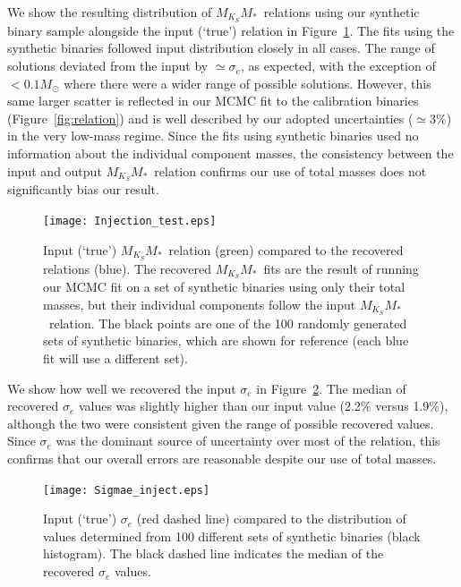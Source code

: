 \documentclass[twocolumn]{aastex62}
\newcommand{\mmk}{$M_{K_S}$\textendash$M_*$}
\begin{document}
We show the resulting distribution of \mmk\ relations using our synthetic binary sample alongside the input (`true') relation in Figure~\ref{fig:inject}. The fits using the synthetic binaries followed input distribution closely in all cases. The range of solutions deviated from the input by $\simeq\sigma_e$, as expected, with the exception of $<0.1M_\odot$ where there were a wider range of possible solutions. However, this same larger scatter is reflected in our MCMC fit to the calibration binaries (Figure~\ref{fig:relation}) and is well described by our adopted uncertainties ($\simeq3\%$) in the very low-mass regime. Since the fits using synthetic binaries used no information about the individual component masses, the consistency between the input and output \mmk\ relation confirms our use of total masses does not significantly bias our result.

\begin{figure}[h]
\begin{center}
\texttt{[image: Injection\_test.eps]}
\caption{Input (`true') \mmk\ relation (green) compared to the recovered relations (blue). The recovered \mmk\ fits are the result of running our MCMC fit on a set of synthetic binaries using only their total masses, but their individual components follow the input \mmk\ relation. The black points are one of the 100 randomly generated sets of synthetic binaries, which are shown for reference (each blue fit will use a different set). }
\label{fig:inject}
\end{center}
\end{figure}

We show how well we recovered the input $\sigma_e$ in Figure~\ref{fig:sigetest}. The median of recovered $\sigma_e$ values was slightly higher than our input value (2.2\% versus 1.9\%), although the two were consistent given the range of possible recovered values. Since $\sigma_e$ was the dominant source of uncertainty over most of the relation, this confirms that our overall errors are reasonable despite our use of total masses. 

\begin{figure}[h]
\begin{center}
\texttt{[image: Sigmae\_inject.eps]}
\caption{Input (`true') $\sigma_e$ (red dashed line) compared to the distribution of values determined from 100 different sets of synthetic binaries (black histogram). The black dashed line indicates the median of the recovered $\sigma_e$ values. }
\label{fig:sigetest}
\end{center}
\end{figure}
\end{document}

